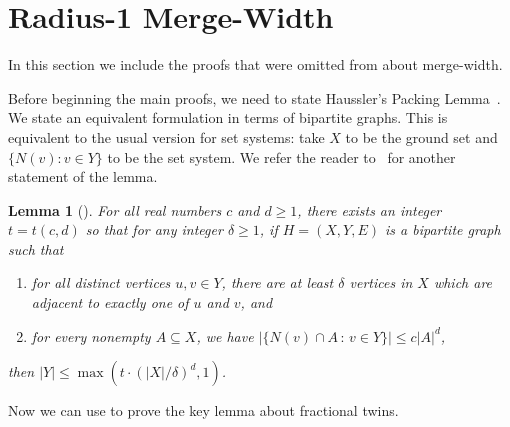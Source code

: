 \documentclass[11pt]{article}
\newtheorem{lemma}[theorem]{Lemma}
\theoremstyle{definition}
\renewcommand{\leq}{\leqslant}
\renewcommand{\geq}{\geqslant}
\newcommand{\set}[1]{\{#1\}}
\begin{document}




\appendix









\section{Radius-1 Merge-Width}
\label{apn:mergeWidth}

In this section we include the proofs that were omitted from  about merge-width.


Before beginning the main proofs, we need to state Haussler's Packing Lemma~\cite{Haussler95}. We state an equivalent formulation in terms of bipartite graphs. This is equivalent to the usual version for set systems: take $X$ to be the ground set and $\{N(v):v \in Y\}$ to be the set system. We refer the reader to~\cite[Lem. 5.14]{discrepancy} for another statement of the lemma.

\begin{lemma}[\cite{Haussler95}]
\label{lem:Haussler}
    For all real numbers $c$ and $d\geq 1$, there exists an integer $t = t(c,d)$ so that for any integer $\delta\geq 1$, if $H=(X,Y,E)$ is a bipartite graph such that\begin{enumerate}
        \item for all distinct vertices $u,v \in Y$, there are at least $\delta$ vertices in $X$ which are adjacent to exactly one of $u$ and $v$, and
        \item for every nonempty $A \subseteq X$, we have $|\set{N(v)\cap A\,:\, v\in Y}| \leq c|A|^d$,
    \end{enumerate}
then $|Y|\leq \max \left(t \cdot (|X|/\delta)^d, 1\right)$.
\end{lemma}

Now we can use  to prove the key lemma about fractional twins.
\end{document}
